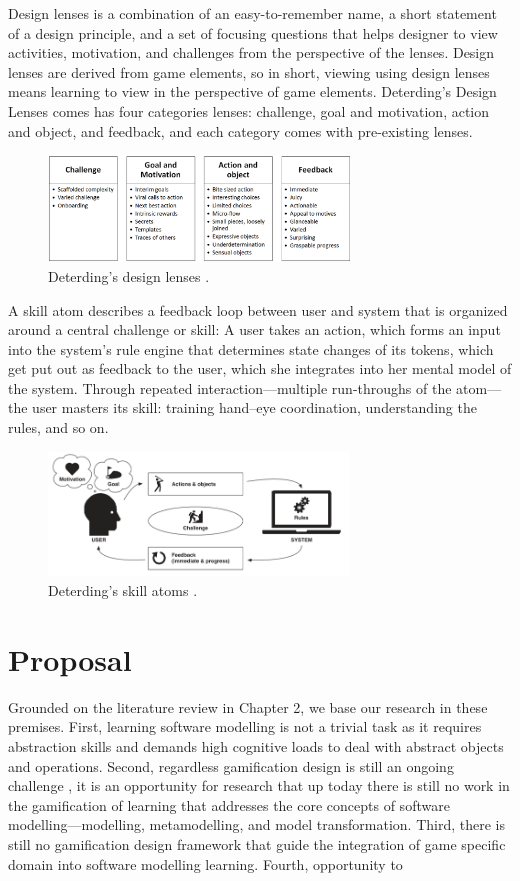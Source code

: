 \documentclass[12pt, a4paper]{report}
\begin{document}
Design lenses is a combination of an easy-to-remember name, a short statement of a design principle, and a set of focusing questions that helps designer to view activities, motivation, and challenges from the perspective of the lenses. Design lenses are derived from game elements, so in short, viewing using design lenses means learning to view in the perspective of game elements. Deterding's Design Lenses comes has four categories lenses: challenge, goal and motivation, action and object, and feedback, and each category comes with pre-existing lenses.

\begin{figure}[ht]
\centering
\includegraphics[width=8cm]{lenses}
\caption{Deterding's design lenses \cite{deterding2015lens}.}
\label{fig:lenses}
\end{figure}


A skill atom describes a feedback loop between user and system that is organized around a central challenge or skill: A user takes an action, which forms an input into the system’s rule engine that determines state changes of its tokens, which get put out as feedback to the user, which she integrates into her mental model of the system. Through repeated interaction—multiple run-throughs of the atom—the user masters its skill: training hand–eye coordination, understanding the rules, and so on.

\begin{figure}[ht]
\centering
\includegraphics[width=8cm]{skill-atoms}
\caption{Deterding's skill atoms \cite{deterding2015lens}.}
\label{fig:skill-atoms}
\end{figure}

\chapter{Proposal}
Grounded on the literature review in Chapter 2, we base our research in these premises. First, learning software modelling is not a trivial task as it requires abstraction skills and demands high cognitive loads to deal with abstract objects and operations. Second, regardless gamification design is still an ongoing challenge \cite{Deterding2013}, it is an opportunity for research that up today there is still no work in the gamification of learning that addresses the core concepts of software modelling—modelling, metamodelling, and model transformation. Third, there is still no gamification design framework that guide the integration of game specific domain into software modelling learning. Fourth, opportunity to 
\end{document}
